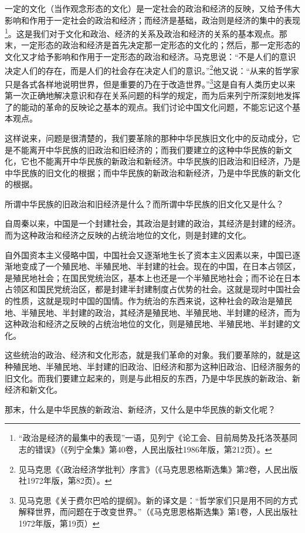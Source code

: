 \documentclass[UTF8, 12pt, a4paper]{ctexrep}
\begin{document}
一定的文化（当作观念形态的文化）是一定社会的政治和经济的反映，又给予伟大影响和作用于一定社会的政治和经济；而经济是基础，政治则是经济的集中的表现\footnote{“政治是经济的最集中的表现”一语，见列宁《论工会、目前局势及托洛茨基同志的错误》（《列宁全集》第40卷，人民出版社1986年版，第212页）。}。这是我们对于文化和政治、经济的关系及政治和经济的关系的基本观点。那末，一定形态的政治和经济是首先决定那一定形态的文化的；然后，那一定形态的文化又才给予影响和作用于一定形态的政治和经济。马克思说：“不是人们的意识决定人们的存在，而是人们的社会存在决定人们的意识。”\footnote{见马克思《〈政治经济学批判〉序言》（《马克思恩格斯选集》第2卷，人民出版社1972年版，第82页）。}他又说：“从来的哲学家只是各式各样地说明世界，但是重要的乃在于改造世界。”\footnote{见马克思《关于费尔巴哈的提纲》。新的译文是：“哲学家们只是用不同的方式解释世界，而问题在于改变世界。”（《马克思恩格斯选集》第1卷，人民出版社1972年版，第19页）}这是自有人类历史以来第一次正确地解决意识和存在关系问题的科学的规定，而为后来列宁所深刻地发挥了的能动的革命的反映论之基本的观点。我们讨论中国文化问题，不能忘记这个基本观点。

这样说来，问题是很清楚的，我们要革除的那种中华民族旧文化中的反动成分，它是不能离开中华民族的旧政治和旧经济的；而我们要建立的这种中华民族的新文化，它也不能离开中华民族的新政治和新经济。中华民族的旧政治和旧经济，乃是中华民族的旧文化的根据；而中华民族的新政治和新经济，乃是中华民族的新文化的根据。

所谓中华民族的旧政治和旧经济是什么？而所谓中华民族的旧文化又是什么？

自周秦以来，中国是一个封建社会，其政治是封建的政治，其经济是封建的经济。而为这种政治和经济之反映的占统治地位的文化，则是封建的文化。

自外国资本主义侵略中国，中国社会又逐渐地生长了资本主义因素以来，中国已逐渐地变成了一个殖民地、半殖民地、半封建的社会。现在的中国，在日本占领区，是殖民地社会；在国民党统治区，基本上也还是一个半殖民地社会；而不论在日本占领区和国民党统治区，都是封建半封建制度占优势的社会。这就是现时中国社会的性质，这就是现时中国的国情。作为统治的东西来说，这种社会的政治是殖民地、半殖民地、半封建的政治，其经济是殖民地、半殖民地、半封建的经济，而为这种政治和经济之反映的占统治地位的文化，则是殖民地、半殖民地、半封建的文化。

这些统治的政治、经济和文化形态，就是我们革命的对象。我们要革除的，就是这种殖民地、半殖民地、半封建的旧政治、旧经济和那为这种旧政治、旧经济服务的旧文化。而我们要建立起来的，则是与此相反的东西，乃是中华民族的新政治、新经济和新文化。

那末，什么是中华民族的新政治、新经济，又什么是中华民族的新文化呢？
\end{document}
